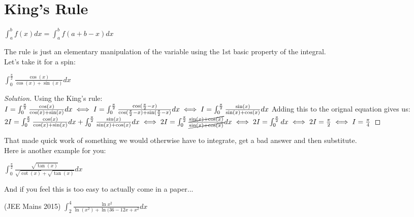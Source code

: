 \section{King's Rule}
\begin{theorem}
    $\int^b_a f(x) dx = \int^b_a f(a+b-x) dx$
\end{theorem}
The rule is just an elementary manipulation of the variable using the 1st basic property of the integral.\\
Let's take it for a spin:\\
\begin{example}
    $\int^{\frac{\pi}{2}}_0 \frac{\cos(x)}{\cos(x)+\sin(x)}dx$
\end{example}
\begin{proof}
[Solution]
    Using the King's rule:\\
    $I= \int^{\frac{\pi}{2}}_0 \frac{\cos(x)}{\cos(x)+\sin(x)}dx\\
    \iff I= \int^{\frac{\pi}{2}}_0 \frac{\cos(\frac{\pi}{2}-x)}{\cos(\frac{\pi}{2}-x)+\sin(\frac{\pi}{2}-x)}dx\\
    \iff I = \int^{\frac{\pi}{2}}_0 \frac{\sin(x)}{\sin(x)+\cos(x)}dx\\$
    Adding this to the orignal equation gives us:\\
    $2I= \int^{\frac{\pi}{2}}_0 \frac{\cos(x)}{\cos(x)+\sin(x)}dx + \int^{\frac{\pi}{2}}_0 \frac{\sin(x)}{\sin(x)+\cos(x)}dx\\
    \iff 2I= \int^{\frac{\pi}{2}}_0 \frac{\cancel{\sin(x)+\cos(x)}}{\cancel{\sin(x)+\cos(x)}}dx\\
    \iff 2I=  \int^{\frac{\pi}{2}}_0 dx\\
    \iff 2I= \frac{\pi}{2}\\
    \iff I= \frac{\pi}{4}
    $
\end{proof}
That made quick work of something we would otherwise have to integrate, get a bad answer and then substitute.\\
Here is another example for you:\\
\begin{example}
    $\int^{\frac{\pi}{2}}_0 \frac{\sqrt{\tan(x)}}{\sqrt{\cot(x)}+\sqrt{\tan(x)}}dx $
\end{example}
And if you feel this is too easy to actually come in a paper...\\
\begin{example}
    (JEE Mains 2015) $\int^4_2 \frac{\ln{x^2}}{\ln(x^2)+\ln(36-12x+x^2}dx$
\end{example}
